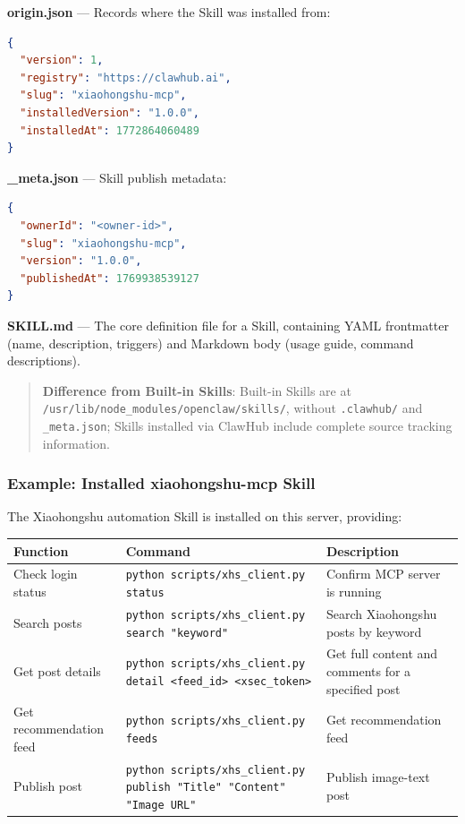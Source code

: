 \textbf{origin.json} --- Records where the Skill was installed from:

\begin{lstlisting}[language=json]
{
  "version": 1,
  "registry": "https://clawhub.ai",
  "slug": "xiaohongshu-mcp",
  "installedVersion": "1.0.0",
  "installedAt": 1772864060489
}
\end{lstlisting}

\textbf{\_meta.json} --- Skill publish metadata:

\begin{lstlisting}[language=json]
{
  "ownerId": "<owner-id>",
  "slug": "xiaohongshu-mcp",
  "version": "1.0.0",
  "publishedAt": 1769938539127
}
\end{lstlisting}

\textbf{SKILL.md} --- The core definition file for a Skill, containing YAML frontmatter (name, description, triggers) and Markdown body (usage guide, command descriptions).

\begin{quote}
\textbf{Difference from Built-in Skills}: Built-in Skills are at \texttt{/usr/lib/node\_modules/openclaw/skills/}, without \texttt{.clawhub/} and \texttt{\_meta.json}; Skills installed via ClawHub include complete source tracking information.
\end{quote}

\subsubsection{Example: Installed xiaohongshu-mcp Skill}


The Xiaohongshu automation Skill is installed on this server, providing:

\begin{table}[h]
\centering
\small
\begin{tabular}{|l|l|l|}
\hline
Function & Command & Description \\
\hline
Check login status & \texttt{python scripts/xhs\_client.py status} & Confirm MCP server is running \\
\hline
Search posts & \texttt{python scripts/xhs\_client.py search "keyword"} & Search Xiaohongshu posts by keyword \\
\hline
Get post details & \texttt{python scripts/xhs\_client.py detail <feed\_id> <xsec\_token>} & Get full content and comments for a specified post \\
\hline
Get recommendation feed & \texttt{python scripts/xhs\_client.py feeds} & Get recommendation feed \\
\hline
Publish post & \texttt{python scripts/xhs\_client.py publish "Title" "Content" "Image URL"} & Publish image-text post \\
\hline
\end{tabular}
\end{table}

